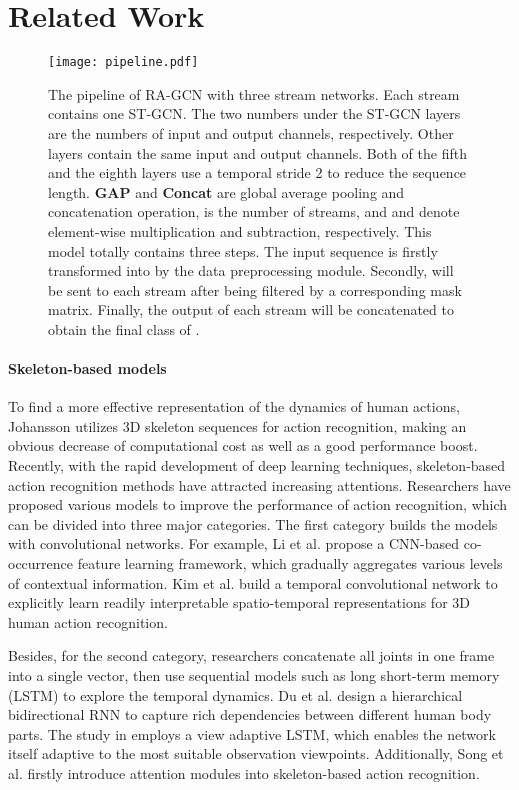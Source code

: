 \documentclass[journal]{IEEEtran}
\begin{document}
\section{Related Work}
\label{sec:related}

\begin{figure*}[t]
    \centering
    \texttt{[image: pipeline.pdf]}
    \caption{The pipeline of RA-GCN with three stream networks. Each stream contains one ST-GCN. The two numbers under the ST-GCN layers are the numbers of input and output channels, respectively. Other layers contain the same input and output channels. Both of the fifth and the eighth layers use a temporal stride 2 to reduce the sequence length. {\bf GAP} and {\bf Concat} are global average pooling and concatenation operation,  is the number of streams, and  and  denote element-wise multiplication and subtraction, respectively. This model totally contains three steps. The input sequence  is firstly transformed into  by the data preprocessing module. Secondly,  will be sent to each stream after being filtered by a corresponding mask matrix. Finally, the output of each stream will be concatenated to obtain the final class of .}
    \label{fig:pipeline}
\end{figure*}

\paragraph{Skeleton-based models} To find a more effective representation of the dynamics of human actions, Johansson \cite{johansson1973visual} utilizes 3D skeleton sequences for action recognition, making an obvious decrease of computational cost as well as a good performance boost. Recently, with the rapid development of deep learning techniques, skeleton-based action recognition methods have attracted increasing attentions. Researchers have proposed various models to improve the performance of action recognition, which can be divided into three major categories. The first category builds the models with convolutional networks. For example, Li et al. \cite{li2018co} propose a CNN-based co-occurrence feature learning framework, which gradually aggregates various levels of contextual information. Kim et al. \cite{soo2017interpretable} build a temporal convolutional network to explicitly learn readily interpretable spatio-temporal representations for 3D human action recognition.

Besides, for the second category, researchers concatenate all joints in one frame into a single vector, then use sequential models such as long short-term memory (LSTM) to explore the temporal dynamics. Du et al. \cite{du2015hierarchical} design a hierarchical bidirectional RNN to capture rich dependencies between different human body parts. The study in \cite{zhang2017view} employs a view adaptive LSTM, which enables the network itself adaptive to the most suitable observation viewpoints. Additionally, Song et al. \cite{song2017end} firstly introduce attention modules into skeleton-based action recognition.
\end{document}
